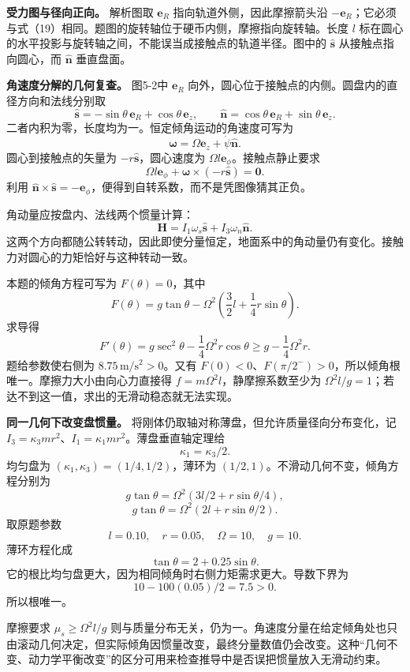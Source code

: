\documentclass[12pt,a4paper,UTF8]{ctexart}
\begin{document}
\textbf{受力图与径向正向。} 解析图取 \(\bm e_R\)
指向轨道外侧，因此摩擦箭头沿
\(-\bm e_R\)；它必须与式（19）相同。题图的旋转轴位于硬币内侧，摩擦指向旋转轴。长度
\(l\) 标在圆心的水平投影与旋转轴之间，不能误当成接触点的轨道半径。图中的
\(\hat{\bm s}\) 从接触点指向圆心，而 \(\hat{\bm n}\) 垂直盘面。

\textbf{角速度分解的几何复查。} 图5-2中 \(\bm e_R\)
向外，圆心位于接触点的内侧。圆盘内的直径方向和法线分别取 \[
\hat{\bm s}=-\sin\theta\,\bm e_R+\cos\theta\,\bm e_z,
\qquad
\hat{\bm n}=\cos\theta\,\bm e_R+\sin\theta\,\bm e_z.
\] 二者内积为零，长度均为一。恒定倾角运动的角速度可写为 \[
\bm\omega=\Omega\bm e_z+\dot\psi\hat{\bm n}.
\] 圆心到接触点的矢量为 \(-r\hat{\bm s}\)，圆心速度为
\(\Omega l\bm e_\phi\)。接触点静止要求 \[
\Omega l\bm e_\phi+\bm\omega\times(-r\hat{\bm s})=\bm0.
\] 利用
\(\hat{\bm n}\times\hat{\bm s}=-\bm e_\phi\)，便得到自转系数，而不是凭图像猜其正负。

角动量应按盘内、法线两个惯量计算： \[
\bm H=I_1\omega_s\hat{\bm s}+I_3\omega_n\hat{\bm n}.
\]
这两个方向都随公转转动，因此即使分量恒定，地面系中的角动量仍有变化。接触力对圆心的力矩恰好与这种转动一致。

本题的倾角方程可写为 \(F(\theta)=0\)，其中 \[
F(\theta)=g\tan\theta-\Omega^2\left(\frac32l+\frac14r\sin\theta\right).
\] 求导得 \[
F'(\theta)=g\sec^2\theta-\frac14\Omega^2r\cos\theta
\ge g-\frac14\Omega^2r.
\] 题给参数使右侧为 \(8.75\,\mathrm{m/s^2}>0\)。又有
\(F(0)<0\)、\(F(\pi/2^-)>0\)，所以倾角根唯一。摩擦力大小由向心力直接得
\(f=m\Omega^2l\)，静摩擦系数至少为
\(\Omega^2l/g=1\)；若达不到这一值，求出的无滑动稳态就无法实现。

\textbf{同一几何下改变盘惯量。}
将刚体仍取轴对称薄盘，但允许质量径向分布变化，记
\(I_3=\kappa_3mr^2\)、\(I_1=\kappa_1mr^2\)。薄盘垂直轴定理给 \[
\kappa_1=\kappa_3/2.
\] 均匀盘为 \((\kappa_1,\kappa_3)=(1/4,1/2)\)，薄环为
\((1/2,1)\)。不滑动几何不变，倾角方程分别为 \[
g\tan\theta=\Omega^2(3l/2+r\sin\theta/4),
\] \[
g\tan\theta=\Omega^2(2l+r\sin\theta/2).
\] 取原题参数 \[
l=0.10,\quad r=0.05,\quad\Omega=10,\quad g=10.
\] 薄环方程化成 \[
\tan\theta=2+0.25\sin\theta.
\] 它的根比均匀盘更大，因为相同倾角时右侧力矩需求更大。导数下界为 \[
10-100(0.05)/2=7.5>0.
\] 所以根唯一。

摩擦要求 \(\mu_s\ge\Omega^2l/g\)
则与质量分布无关，仍为一。角速度分量在给定倾角处也只由滚动几何决定，但实际倾角因惯量改变，最终分量数值仍会改变。这种``几何不变、动力学平衡改变''的区分可用来检查推导中是否误把惯量放入无滑动约束。

\newpage
\end{document}
